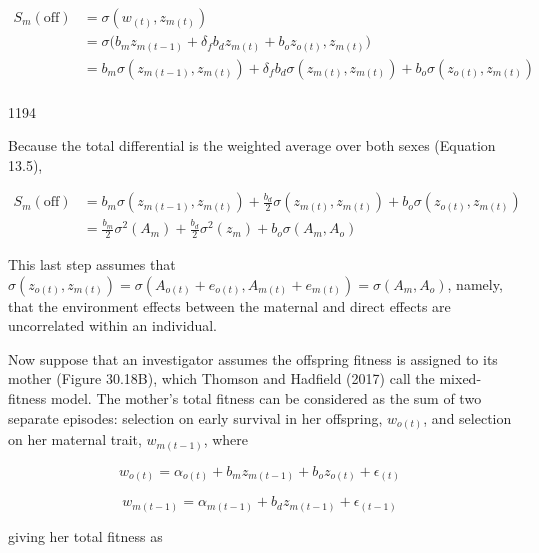 \documentclass{article}
\begin{document}
\begin{equation}
\begin{aligned}S_{m}(\mathrm{off})&=\sigma(w_{(t)},z_{m(t)})\\&=\sigma\big(b_{m}z_{m(t-1)}+\delta_{f}b_{d}z_{m(t)}+b_{o}z_{o(t)},z_{m(t)}\big)\\&=b_{m}\sigma(z_{m(t-1)},z_{m(t)})+\delta_{f}b_{d}\sigma(z_{m(t)},z_{m(t)})+b_{o}\sigma(z_{o(t)},z_{m(t)})\\ \end{aligned}
\tag{30.40c}
\label{eq:30_40c}
\end{equation}

1194

Because the total differential is the weighted average over both sexes (Equation 13.5),

\begin{equation}
\begin{align*}S_{m}(\mathrm{off})&=b_{m}\sigma(z_{m(t-1)},z_{m(t)})+\frac{b_{d}}{2}\sigma(z_{m(t)},z_{m(t)})+b_{o}\sigma(z_{o(t)},z_{m(t)})\\&=\frac{b_{m}}{2}\sigma^{2}(A_{m})+\frac{b_{d}}{2}\sigma^{2}(z_{m})+b_{o}\sigma(A_{m},A_{o})\end{align*}
\tag{30.40d}
\label{eq:30_40d}
\end{equation}

This last step assumes that  $ \sigma(z_{o(t)}, z_{m(t)}) = \sigma(A_{o(t)} + e_{o(t)}, A_{m(t)} + e_{m(t)}) = \sigma(A_{m}, A_{o}) $, namely, that the environment effects between the maternal and direct effects are uncorrelated within an individual.

Now suppose that an investigator assumes the offspring fitness is assigned to its mother (Figure 30.18B), which Thomson and Hadfield (2017) call the mixed-fitness model. The mother's total fitness can be considered as the sum of two separate episodes: selection on early survival in her offspring,  $ w_{o(t)} $, and selection on her maternal trait,  $ w_{m(t-1)} $, where

\begin{equation}
w_{o(t)}=\alpha_{o(t)}+b_{m}z_{m(t-1)}+b_{o}z_{o(t)}+\epsilon_{(t)}
\tag{30.41a}
\label{eq:30_41a}
\end{equation}

\begin{equation}
w_{m(t-1)}=\alpha_{m(t-1)}+b_{d}z_{m(t-1)}+\epsilon_{(t-1)}
\tag{30.41b}
\label{eq:30_41b}
\end{equation}

giving her total fitness as
\end{document}
